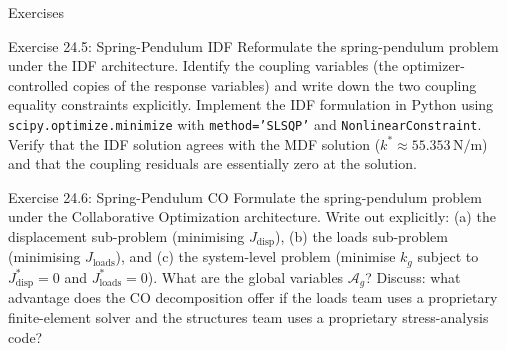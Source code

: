 \documentclass[aspectratio=169,10pt]{beamer}
\begin{document}
\begin{frame}[allowframebreaks]{Exercises}
  \begin{block}{Exercise 24.5: Spring-Pendulum IDF}
    Reformulate the spring-pendulum problem under the IDF architecture.
    Identify the coupling variables (the optimizer-controlled copies of
    the response variables) and write down the two coupling equality
    constraints explicitly.
    Implement the IDF formulation in Python using
    \texttt{scipy.optimize.minimize} with \texttt{method='SLSQP'} and
    \texttt{NonlinearConstraint}.
    Verify that the IDF solution agrees with the MDF solution
    ($k^* \approx 55.353\,\mathrm{N/m}$) and that the coupling residuals
    are essentially zero at the solution.
  \end{block}

  \begin{block}{Exercise 24.6: Spring-Pendulum CO}
    Formulate the spring-pendulum problem under the Collaborative
    Optimization architecture.  Write out explicitly:
    (a) the displacement sub-problem (minimising $J_{\mathrm{disp}}$),
    (b) the loads sub-problem (minimising $J_{\mathrm{loads}}$), and
    (c) the system-level problem (minimise $k_g$ subject to $J^*_{\mathrm{disp}}=0$
    and $J^*_{\mathrm{loads}}=0$).
    What are the global variables $\mathcal{A}_g$?
    Discuss: what advantage does the CO decomposition offer if the
    loads team uses a proprietary finite-element solver and the
    structures team uses a proprietary stress-analysis code?
  \end{block}

\end{frame}
\end{document}
